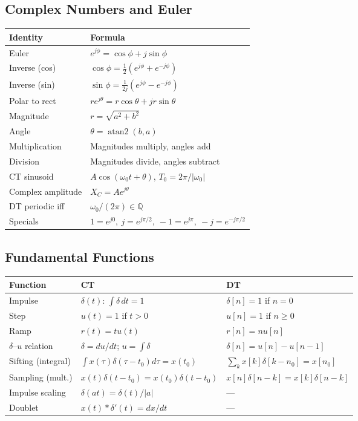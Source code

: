 \documentclass[11pt]{article}
\newcommand{\Conv}{\ast}
\begin{document}
\subsection{Complex Numbers and Euler}
\begin{center}
\begin{tabular}{|l|l|}
\hline
Identity & Formula\\
\hline
Euler & $e^{j\phi} = \cos\phi + j\sin\phi$\\
Inverse (cos) & $\cos\phi = \tfrac12(e^{j\phi}+e^{-j\phi})$\\
Inverse (sin) & $\sin\phi = \tfrac{1}{2j}(e^{j\phi}-e^{-j\phi})$\\
Polar to rect & $re^{j\theta} = r\cos\theta + jr\sin\theta$\\
Magnitude & $r = \sqrt{a^2+b^2}$\\
Angle & $\theta = \operatorname{atan2}(b,a)$\\
Multiplication & Magnitudes multiply, angles add\\
Division & Magnitudes divide, angles subtract\\
CT sinusoid & $A\cos(\omega_0 t+\theta)$, $T_0 = 2\pi/|\omega_0|$\\
Complex amplitude & $X_C = A e^{j\theta}$\\
DT periodic iff & $\omega_0/(2\pi) \in \mathbb{Q}$\\
Specials & $1=e^{j0},\ j=e^{j\pi/2},\ -1=e^{j\pi},\ -j=e^{-j\pi/2}$\\
\hline
\end{tabular}
\end{center}

\subsection{Fundamental Functions}
\begin{center}
\begin{tabular}{|l|l|l|}
\hline
Function & CT & DT\\
\hline
Impulse & $\delta(t)$: $\int\delta\,dt = 1$ & $\delta[n]=1$ if $n=0$\\
Step & $u(t)=1$ if $t>0$ & $u[n]=1$ if $n\ge 0$\\
Ramp & $r(t)=tu(t)$ & $r[n]=nu[n]$\\
$\delta$--$u$ relation & $\delta = du/dt$; $u=\int\delta$ & $\delta[n]=u[n]-u[n-1]$\\
Sifting (integral) & $\int x(\tau)\delta(\tau-t_0)d\tau = x(t_0)$ & $\sum_k x[k]\delta[k-n_0]=x[n_0]$\\
Sampling (mult.) & $x(t)\delta(t-t_0) = x(t_0)\delta(t-t_0)$ & $x[n]\delta[n-k]=x[k]\delta[n-k]$\\
Impulse scaling & $\delta(at) = \delta(t)/|a|$ & ---\\
Doublet & $x(t)\Conv\delta'(t) = dx/dt$ & ---\\
\hline
\end{tabular}
\end{center}
\end{document}
